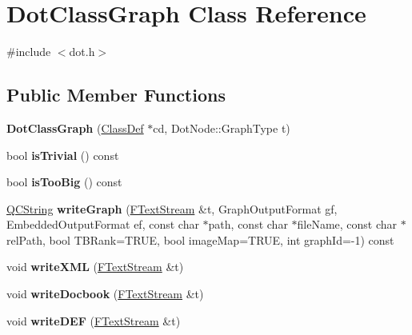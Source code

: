 \hypertarget{class_dot_class_graph}{}\section{Dot\+Class\+Graph Class Reference}
\label{class_dot_class_graph}


{\ttfamily \#include $<$dot.\+h$>$}

\subsection*{Public Member Functions}
\begin{DoxyCompactItemize}
\item 
\mbox{\label{class_dot_class_graph_a58b57d060db4c9c4127e13719ed497b0}} 
{\bfseries Dot\+Class\+Graph} (\mbox{\hyperlink{class_class_def}{Class\+Def}} $\ast$cd, Dot\+Node\+::\+Graph\+Type t)
\item 
\mbox{\label{class_dot_class_graph_a828e0e888fb52189a320a57a1eb96fe7}} 
bool {\bfseries is\+Trivial} () const
\item 
\mbox{\label{class_dot_class_graph_a4779548a943f89fd72b36b3d3694c135}} 
bool {\bfseries is\+Too\+Big} () const
\item 
\mbox{\label{class_dot_class_graph_a71e5ca207d298774c50fe025f607f6fa}} 
\mbox{\hyperlink{class_q_c_string}{Q\+C\+String}} {\bfseries write\+Graph} (\mbox{\hyperlink{class_f_text_stream}{F\+Text\+Stream}} \&t, Graph\+Output\+Format gf, Embedded\+Output\+Format ef, const char $\ast$path, const char $\ast$file\+Name, const char $\ast$rel\+Path, bool T\+B\+Rank=T\+R\+UE, bool image\+Map=T\+R\+UE, int graph\+Id=-\/1) const
\item 
\mbox{\label{class_dot_class_graph_ab0c9eaee7ee8abd4ffe7f849dd449da8}} 
void {\bfseries write\+X\+ML} (\mbox{\hyperlink{class_f_text_stream}{F\+Text\+Stream}} \&t)
\item 
\mbox{\label{class_dot_class_graph_a0b0d779c62489f345b60ae041bfbb61b}} 
void {\bfseries write\+Docbook} (\mbox{\hyperlink{class_f_text_stream}{F\+Text\+Stream}} \&t)
\item 
\mbox{\label{class_dot_class_graph_a58ac0d426aa0e05f0624ea0aff1cfb11}} 
void {\bfseries write\+D\+EF} (\mbox{\hyperlink{class_f_text_stream}{F\+Text\+Stream}} \&t)
\end{DoxyCompactItemize}
